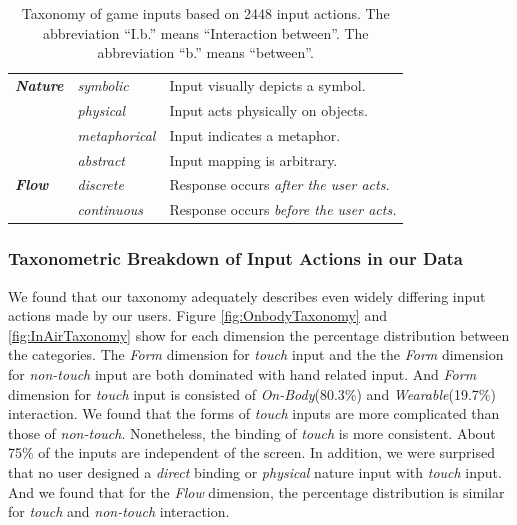 \documentclass{sigchi}
\begin{document}
\begin{table}
\begin{adjustwidth}{-0.5cm}{}
\begin{tabular}{|l|l|l|}
        \textbf{\em{Nature}} & \em{symbolic} & Input visually depicts a symbol.\\ \cline{2-3} 
             & \em{physical} & Input acts physically on objects.\\ \cline{2-3} 
             & \em{metaphorical} & Input indicates a metaphor.\\ \cline{2-3} 
             & \em{abstract} & Input mapping is arbitrary.\\
      \Xhline{4\arrayrulewidth}
        \textbf{\em{Flow}} & \em{discrete} & Response occurs \em{after} the user acts.\\ \cline{2-3} 
             & \em{continuous} & Response occurs \em{before} the user acts.\\
      \hline
    \end{tabular}
    \caption{Taxonomy of game inputs based on 2448 input actions. The abbreviation ``I.b.'' means ``Interaction between''. The abbreviation ``b.'' means ``between''.}
    \label{tab:taxonomy}
    \end{adjustwidth}
  \end{table}
 

 \subsubsection{Taxonometric Breakdown of Input Actions in our Data}
We found that our taxonomy adequately describes even widely differing input actions made by our users. Figure \ref{fig:OnbodyTaxonomy} and \ref{fig:InAirTaxonomy} show for each dimension the percentage distribution between the categories. The \emph{Form} dimension for \emph{touch} input and the the \emph{Form} dimension for \emph{non-touch} input are both dominated with hand related input. And \emph{Form} dimension for \emph{touch} input is consisted of \emph{On-Body}(80.3\%) and \emph{Wearable}(19.7\%) interaction. We found that the forms of \emph{touch} inputs are more complicated than those of \emph{non-touch}. Nonetheless, the binding of \emph{touch} is more consistent. About 75\% of the inputs are independent of the screen. In addition, we were surprised that no user designed a \emph{direct} binding or \emph{physical} nature input with \emph{touch} input. And we found that for the \emph{Flow} dimension, the percentage distribution is similar for \emph{touch} and \emph{non-touch} interaction.
\end{document}
